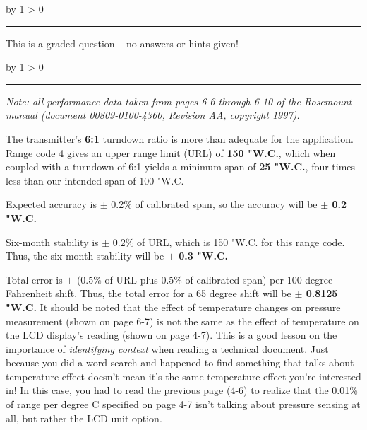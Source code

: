\documentclass[12pt,a4paper]{article}
\def\svar{
           \advance\answnum by 1
           \ifnum \answnum > 0
                \hrule
                \vskip 3pt
                \leftline{Svar \the\answnum}
                \vskip 3pt \fi}
\def\notes{
           \advance\explnum by 1
           \ifnum \explnum > 0
                \hrule
                \vskip 3pt
                \leftline{Notes \the\explnum}
                \vskip 3pt \fi}
\begin{document}
\vfil 

\eject
\vskip 10pt \filbreak 





\svar{} 

This is a graded question -- no answers or hints given!

\vskip 10pt \filbreak 





\notes{} 

{\it Note: all performance data taken from pages 6-6 through 6-10 of the Rosemount manual (document 00809-0100-4360, Revision AA, copyright 1997).}

\vskip 10pt

The transmitter's {\bf 6:1} turndown ratio is more than adequate for the application.  Range code 4 gives an upper range limit (URL) of {\bf 150 "W.C.}, which when coupled with a turndown of 6:1 yields a minimum span of {\bf 25 "W.C.}, four times less than our intended span of 100 "W.C.

\vskip 10pt

Expected accuracy is $\pm$ 0.2\% of calibrated span, so the accuracy will be {\bf $\pm$ 0.2 "W.C.}

\vskip 10pt

Six-month stability is $\pm$ 0.2\% of URL, which is 150 "W.C. for this range code.  Thus, the six-month stability will be {\bf $\pm$ 0.3 "W.C.}

\vskip 10pt

Total error is $\pm$ (0.5\% of URL plus 0.5\% of calibrated span) per 100 degree Fahrenheit shift.  Thus, the total error for a 65 degree shift will be {\bf $\pm$ 0.8125 "W.C.}  It should be noted that the effect of temperature changes on pressure measurement (shown on page 6-7) is not the same as the effect of temperature on the LCD display's reading (shown on page 4-7).  This is a good lesson on the importance of {\it identifying context} when reading a technical document.  Just because you did a word-search and happened to find something that talks about temperature effect doesn't mean it's the same temperature effect you're interested in!  In this case, you had to read the previous page (4-6) to realize that the 0.01\% of range per degree C specified on page 4-7 isn't talking about pressure sensing at all, but rather the LCD unit option.

\end{document}
